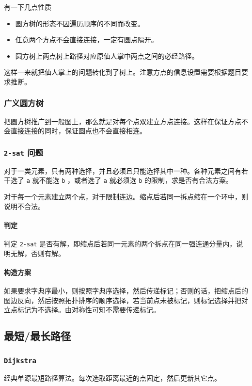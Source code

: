 \documentclass[UTF-8]{ctexart}
\begin{document}
				有一下几点性质
	\begin{itemize}
		\item 圆方树的形态不因遍历顺序的不同而改变。
		\item 任意两个方点不会直接连接，一定有圆点隔开。
		\item 圆方树上两点树上路径对应原仙人掌中两点之间的必经路径。
	\end{itemize}
	
	这样一来就把仙人掌上的问题转化到了树上。注意方点的信息设置需要根据题目要求推断。
	
	\subsubsection{广义圆方树}
	把圆方树推广到一般图上，那么就是对每个点双建立方点连接。这样在保证方点不会直接连接的同时，保证圆点也不会直接相连。
	
	\subsubsection{\texttt{2-sat} 问题}
	对于一类元素，只有两种选择，并且必须且只能选择其中一种。各种元素之间有若干选了 \texttt{a} 就不能选 \texttt{b} ，或者选了 \texttt{a} 就必须选 \texttt{b} 的限制，求是否有合法方案。
	
	对于每一个元素建立两个点，对于限制连边。缩点后若同一拆点缩在一个环中，则说明不合法。
	
	\paragraph{判定}判定 \texttt{2-sat} 是否有解，即缩点后若同一元素的两个拆点在同一强连通分量内，说明无解，否则有解。
	
	\paragraph{构造方案} 如果要求字典序最小，则按照字典序选择，然后传递标记；否则的话，把缩点后的图边反向，然后按照拓扑排序的顺序选择，若当前点未被标记，则标记选择并把对立点标记为不选择。由对称性可知不需要传递标记。
	
	\subsection{最短/最长路径}
	\subsubsection{\texttt{Dijkstra}}
	经典单源最短路径算法。每次选取距离最近的点固定，然后更新其它点。
	
\end{document}

